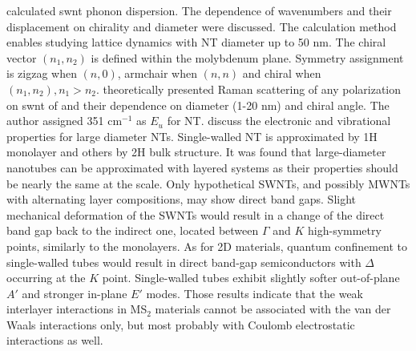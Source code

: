 \citeauthor{Dobardzic2005} calculated  \gls{swnt} phonon dispersion. The dependence of wavenumbers and their displacement on chirality and diameter were discussed. The calculation method enables studying lattice dynamics with NT diameter up to 50 nm. The chiral vector $(n_1, n_2)$ is defined within the molybdenum plane. Symmetry assignment is zigzag when $(n,0)$, armchair when $(n,n)$ and chiral when $(n_1, n_2), n_1>n_2$. \citeauthor{Dobardzic2006} theoretically presented Raman scattering of any polarization on \gls{swnt} of  and their dependence on diameter (1-20 nm) and chiral angle. The author assigned 351 cm$^{-1}$ as $E_u$ for  NT.\cite{Dobardzic2006} \citeauthor{Ghorbani-Asl2013} discuss the electronic and vibrational properties for large diameter  NTs\cite{Ghorbani-Asl2013}. Single-walled NT is approximated by 1H monolayer and others by 2H bulk structure. It was found that large-diameter nanotubes can be approximated with layered systems as their properties should be nearly the same at the scale. Only hypothetical SWNTs, and possibly MWNTs with alternating layer compositions, may show direct band gaps. Slight mechanical deformation of the SWNTs would result in a change of the direct band gap back to the indirect one, located between $\Gamma$ and $K$ high-symmetry points, similarly to the monolayers. As for 2D materials, quantum confinement to single-walled tubes would result in direct band-gap semiconductors with $\Delta$ occurring at the $K$ point. Single-walled tubes exhibit slightly softer out-of-plane $A'$ and stronger in-plane $E'$ modes. Those results indicate that the weak interlayer interactions in MS$_2$ materials cannot be associated with the van der Waals interactions only, but most probably with Coulomb electrostatic interactions as well.


